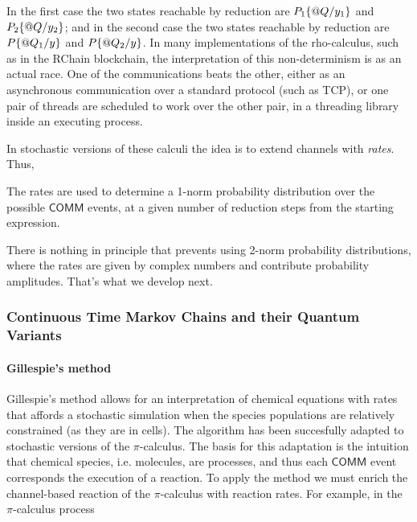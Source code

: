 
In the first case the two states reachable by reduction are
$P_{1}\{ \mathsf{@} Q / y_{1} \}$ and
$P_{2}\{ \mathsf{@} Q / y_{2} \}$; and in the second case the two
states reachable by reduction are $P\{ \mathsf{@} Q_{1} / y \}$ and
$P\{ \mathsf{@} Q_{2} / y \}$. In many implementations of the
rho-calculus, such as in the RChain blockchain, the interpretation of
this non-determinism is as an actual race. One of the communications
beats the other, either as an asynchronous communication over a
standard protocol (such as TCP), or one pair of threads are scheduled
to work over the other pair, in a threading library inside an
executing process.

In stochastic versions of these calculi the idea is to extend channels
with \emph{rates}. Thus,


The rates are used to determine a 1-norm probability distribution over
the possible $\mathsf{COMM}$ events, at a given number of reduction
steps from the starting expression.

There is nothing in principle that prevents using 2-norm probability
distributions, where the rates are given by complex numbers and
contribute probability amplitudes. That's what we develop next.

\subsubsection{Continuous Time Markov Chains and their Quantum Variants}
\paragraph{Gillespie's method}
Gillespie's method \cite{Gillespie2007} allows for an interpretation
of chemical equations with rates that affords a stochastic simulation
when the species populations are relatively constrained (as they are
in cells). The algorithm has been succesfully adapted to stochastic
versions of the $\pi$-calculus. The basis for this adaptation is the
intuition that chemical species, i.e. molecules, are processes, and
thus each $\mathsf{COMM}$ event corresponds the execution of a
reaction. To apply the method we must enrich the channel-based
reaction of the $\pi$-calculus with reaction rates. For example, in
the $\pi$-calculus process

